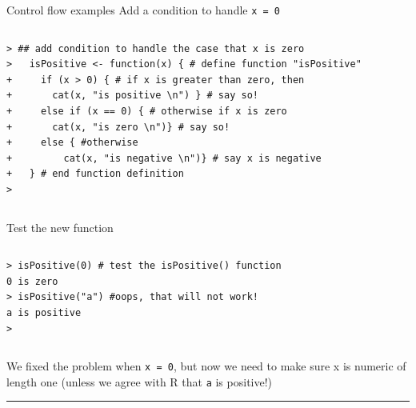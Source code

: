 \documentclass[table,smaller]{beamer}
\begin{document}
\begin{frame}[fragile,label=sec-6-3]{Control flow examples}
 Add a condition to handle \texttt{x = 0}

\vspace{-.5em}
\begin{columns}
\begin{block}{}
\begin{verbatim}
> ## add condition to handle the case that x is zero
>   isPositive <- function(x) { # define function "isPositive"
+     if (x > 0) { # if x is greater than zero, then
+       cat(x, "is positive \n") } # say so! 
+     else if (x == 0) { # otherwise if x is zero
+       cat(x, "is zero \n")} # say so!
+     else { #otherwise
+         cat(x, "is negative \n")} # say x is negative
+   } # end function definition
>
\end{verbatim}
\end{block}
\end{columns}
\vspace{.5em}

Test the new function

\vspace{-.5em}
\begin{columns}
\begin{block}{}
\begin{verbatim}
> isPositive(0) # test the isPositive() function
0 is zero 
> isPositive("a") #oops, that will not work!
a is positive 
>
\end{verbatim}
\end{block}
\end{columns}
\vspace{.5em}

We fixed the problem when \texttt{x = 0}, but now we need to make sure x is numeric of length one (unless we agree with R that \texttt{a} is positive!)

\rule{\linewidth}{0.5pt}
\end{frame}
\end{document}
